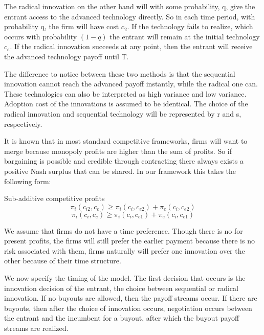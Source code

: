 
The radical innovation on the other hand will with some probability, q, give the entrant access to the advanced technology directly. So in each time period, with probability q, the firm will have cost $c_2$. If the technology fails to realize, which occurs with probability $(1-q)$ the entrant will remain at the initial technology $c_e$. If the radical innovation succeeds at any point, then the entrant will receive the advanced technology payoff until T. 


The difference to notice between these two methods is that the sequential innovation cannot reach the advanced payoff instantly, while the radical one can. These technologies can also be interpreted as high variance and low variance. Adoption cost of the innovations is assumed to be identical. The choice of the radical innovation and sequential technology will be represented by r and s, respectively.  


It is known that in most standard competitive frameworks, firms will want to merge because monopoly profits are higher than the sum of profits. So if bargaining is possible and credible through contracting there always exists a positive Nash surplus that can be shared. In our framework this takes the following form: 

\begin{assumption}{Sub-additive competitive profits}
\begin{equation*}
\pi_{i}(c_{i2},c_{e}) \geq  \pi_{i}(c_{i},c_{e2}) + \pi_{e}(c_{i},c_{e2})
\end{equation*}
\begin{equation*}
\pi_{i}(c_{i},c_{e}) \geq  \pi_{i}(c_{i},c_{e1}) + \pi_{e}(c_{i},c_{e1})
\end{equation*}
\end{assumption}


We assume that firms do not have a time preference. Though there is no  for present profits, the firms will still prefer the earlier payment because there is no risk associated with them, firms naturally will prefer one innovation over the other because of their time structure. 

We now specify the timing of the model. The first decision that occurs is the innovation decision of the entrant, the choice between sequential or radical innovation. If no buyouts are allowed, then the payoff streams occur. If there are buyouts, then after the choice of innovation occurs, negotiation occurs between the entrant and the incumbent for a buyout, after which the buyout payoff streams are realized.

